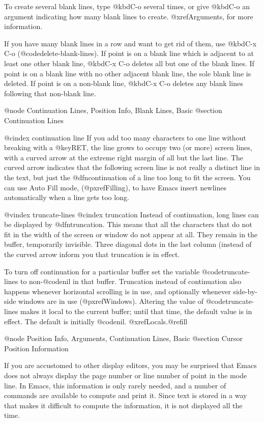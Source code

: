 {{  To create several blank lines, type @kbd{C-o} several times, or
give @kbd{C-o} an argument indicating how many blank lines to create.
@xref{Arguments}, for more information.

  If you have many blank lines in a row and want to get rid of them, use
@kbd{C-x C-o} (@code{delete-blank-lines}).  If point is on a blank
line which is adjacent to at least one other blank line, @kbd{C-x C-o}
deletes all but one of the blank lines.
If point is on a blank line with no other adjacent blank line, the
sole blank line is deleted.  If point is on a non-blank
line, @kbd{C-x C-o} deletes any blank lines following that non-blank
line.

@node Continuation Lines, Position Info, Blank Lines, Basic
@section Continuation Lines

@cindex continuation line
  If you add too many characters to one line without breaking with a
@key{RET}, the line grows to occupy two (or more) screen lines, with a
curved arrow at the extreme right margin of all but the last line.  The
curved arrow indicates that the following screen line is not really a
distinct line in the text, but just the @dfn{continuation} of a line too
long to fit the screen.  You can use Auto Fill mode, (@pxref{Filling}),
to have Emacs insert newlines automatically when a line gets too long.


@vindex truncate-lines
@cindex truncation
  Instead of continuation, long lines can be displayed by @dfn{truncation}.
This means that all the characters that do not fit in the width of the
screen or window do not appear at all.  They remain in the buffer,
temporarily invisible.  Three diagonal dots in the last column (instead of
the curved arrow inform you that truncation is in effect.

  To turn off continuation for a particular buffer set the
variable @code{truncate-lines} to non-@code{nil} in that buffer.
Truncation instead of continuation also happens whenever horizontal
scrolling is in use, and optionally whenever side-by-side windows are in
use (@pxref{Windows}).  Altering the value of @code{truncate-lines} makes
it local to the current buffer; until that time, the default value is in
effect.  The default is initially @code{nil}.  @xref{Locals}.@refill

@node Position Info, Arguments, Continuation Lines, Basic
@section Cursor Position Information

  If you are accustomed to other display editors, you may be surprised
that Emacs does not always display the page number or line number of
point in the mode line.  In Emacs, this information is only rarely
needed, and a number of commands are available to compute and print it.
Since text is stored in a way that makes it difficult to compute the
information, it is not displayed all the time.

}}
